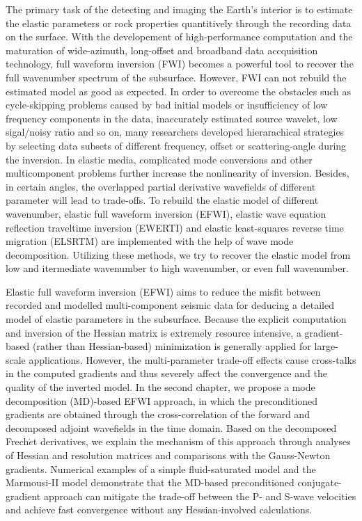 \begin{eabstract}
	The primary task of the detecting and imaging the Earth's interior is to estimate the elastic parameters or rock properties
	quantitively
	through the recording data on the surface. With the developement of 
	high-performance computation and the
	maturation of wide-azimuth, long-offset and broadband data accquisition 
	technology, full waveform inversion (FWI) becomes a powerful tool to recover the full
	 wavenumber spectrum of the subsurface. However, FWI can not rebuild the estimated
	model as good as expected. In order to overcome the obstacles such as cycle-skipping problems
	caused by bad initial models or
	insufficiency of low frequency components in the data, inaccurately estimated source
	wavelet, low sigal/noisy ratio and so on, many researchers developed hierarachical strategies
	by selecting data subsets of different frequency, offset or scattering-angle during the
	inversion.	
	In elastic media, complicated mode conversions and other multicomponent problems further increase the
	nonlinearity of inversion. Besides, in certain angles, the overlapped partial derivative wavefields of  different
	parameter will lead to trade-offs.
	To rebuild the elastic model of different wavenumber, elastic full waveform
	inversion (EFWI), elastic wave equation 
	reflection traveltime inversion (EWERTI) and elastic least-squares reverse time
	migration (ELSRTM) are implemented with the help of wave mode decomposition. Utilizing these
	methods, we
	try to recover the elastic model from low and itermediate wavenumber to high
	wavenumber, or even full wavenumber.

Elastic full waveform inversion (EFWI) aims to reduce the misfit between recorded and modelled multi-component
seismic data for deducing a detailed model of elastic parameters in the subsurface.
Because the explicit computation and inversion of the Hessian matrix
is extremely resource intensive,
a gradient-based (rather than Hessian-based) minimization is generally applied for large-scale applications.
However, the multi-parameter trade-off effects cause cross-talks in the computed gradients and
thus severely affect the convergence and the quality of the inverted model.
In the second chapter, we propose a mode decomposition (MD)-based EFWI approach, in which the preconditioned gradients
are obtained through the cross-correlation of the forward and
decomposed adjoint wavefields in the time domain.
Based on the decomposed Frech{$\acute{e}$}t derivatives,
we explain the mechanism of this approach through analyses of Hessian and resolution matrices
and comparisons with the Gauss-Newton gradients.
Numerical examples of a simple fluid-saturated model and the Marmousi-II model
demonstrate that the MD-based preconditioned conjugate-gradient approach
can mitigate the trade-off between the P- and S-wave velocities and achieve fast
convergence without any Hessian-involved calculations.


\end{eabstract}
